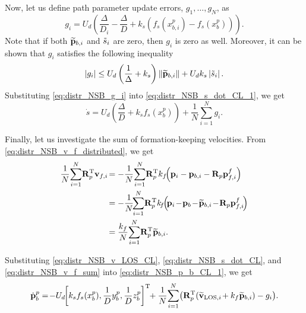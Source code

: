 Now, let us define path parameter update errors, $g_1, \ldots, g_N$, as
\begin{equation}
    g_i = U_{d\!} \left(\!\frac{\Delta}{D_i} - \frac{\Delta}{D} + k_s \! \left(f_{s\!\!}\left(x_{b, i\!}^p\right) - f_{s\!}\left(x_{b\!}^p\right)\right)\!\right).
    \label{eq:distr_NSB_g_i}
\end{equation}
Note that if both $\widetilde{\mathbf{p}}_{b, i}$ and $\Tilde{s}_i$ are zero, then $g_i$ is zero as well.
Moreover, it can be shown that $g_i$ satisfies the following inequality
\begin{equation}
    \left|g_i\right| \leq U_d \left(\frac{1}{\Delta} + k_s\right) \left\|\widetilde{\mathbf{p}}_{b, i}\right\| + U_d k_s \left|\Tilde{s}_i\right|.
    \label{eq:distr_NSB_g_i_bound}
\end{equation}
Substituting \eqref{eq:distr_NSB_g_i} into \eqref{eq:distr_NSB_s_dot_CL_1}, we get
\begin{equation}
    \dot{s} = U_{d\!} \left(\!\frac{\Delta}{D} + k_s f_{s\!}\left(x_{b\!}^p\right)\right) + \frac{1}{N} \sum_{i=1}^N g_i.
    \label{eq:distr_NSB_s_dot_CL}
\end{equation}

Finally, let us investigate the sum of formation-keeping velocities.
From \eqref{eq:distr_NSB_v_f_distributed}, we get
\begin{equation}
    \begin{split}
    \frac{1}{N} \! \sum_{i=1}^N \! \mat{R}_p\T \ivel_{f, i\!} &= -\frac{1}{N} \! \sum_{i=1}^N \! \mat{R}_p\T k_f \!\! \left(\mat{p}_i - \mat{p}_{b,i} - \mat{R}_p\mat{p}_{f, i}^f\right) \\
    &= -\frac{1}{N} \!\! \sum_{i=1}^N \! \mat{R}_p\T k_{\!f\!} \! \left(\! \mat{p}_{i\!} -\! \mat{p}_{b\!} -\! \widetilde{\mat{p}}_{b, i\!} -\! \mat{R}_p\mat{p}_{f, i\!}^f\right) \\
    &= \frac{k_f}{N} \! \sum_{i=1}^N \! \mat{R}_p\T \widetilde{\mat{p}}_{b, i}.
    \end{split}
    \label{eq:distr_NSB_v_f_sum}
\end{equation}

Substituting \eqref{eq:distr_NSB_v_LOS_CL}, \eqref{eq:distr_NSB_s_dot_CL}, and \eqref{eq:distr_NSB_v_f_sum} into \eqref{eq:distr_NSB_p_b_CL_1}, we get
\begin{equation}
        \dot{\mat{p}}_b^p =\! - U_{d\!} \!\inlinevector{k_s f_s\!\left(x_b^p\right)\!, \frac{1}{D} y_b^p, \frac{1}{D} z_b^p}\!\! + \frac{1}{N}\! \sum_{i=1}^N\! \left(\mat{R}_p\T \!\left(\widetilde{\ivel}_{{\rm LOS}, i\!} + k_f \widetilde{\mat{p}}_{b, i}\right) - g_i \right)\!.
    \label{eq:distr_NSB_p_b_CL}
\end{equation}

